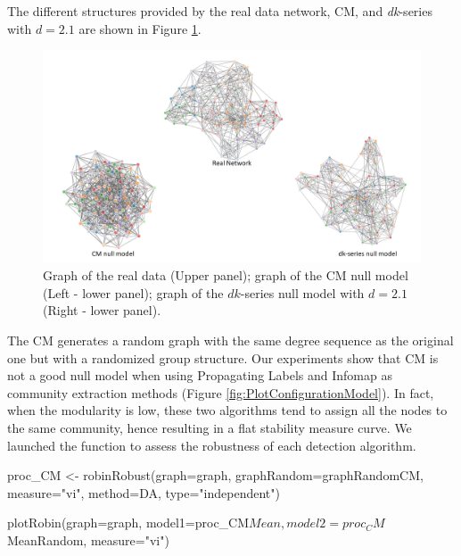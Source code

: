 The different structures provided by the real data network, CM, and {\it dk}-series with $d=2.1$ are shown in Figure \ref{fig:PlotGraph}.  

\begin{figure}[h!]
\centering
\includegraphics[width=14cm]{network.png}
\caption{Graph of the real data (Upper panel); graph of the CM null model (Left - lower panel); graph of the $dk$-series null model with $d=2.1$ (Right - lower panel).}
\label{fig:PlotGraph}
\end{figure}

The CM generates a random graph with the same degree sequence as the original one but with a randomized group structure. 
Our experiments show that CM is not a good null model when using Propagating Labels and Infomap as community extraction methods (Figure \ref{fig:PlotConfigurationModel}). 
In fact, when the modularity is low, these two algorithms tend to assign all the nodes to the same community, hence resulting in a flat stability measure curve. We launched the function   to assess the robustness of each detection algorithm.  

\begin{example}

proc_CM <- robinRobust(graph=graph, graphRandom=graphRandomCM,
                       measure="vi", method=DA, type="independent")

plotRobin(graph=graph, model1=proc_CM$Mean,model2=proc_CM$MeanRandom,
          measure="vi") 
\end{example}
 
